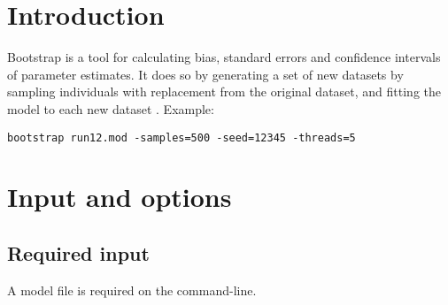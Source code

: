 



\maketitle
\newcommand{\guidetoolname}{bootstrap}


\section{Introduction}

Bootstrap is a tool for calculating bias, standard errors and confidence intervals of parameter estimates. It does so by generating a set of new datasets by sampling individuals with replacement from the original dataset, and fitting the model to each new dataset \cite{Efron}. 
Example:
\begin{verbatim}
bootstrap run12.mod -samples=500 -seed=12345 -threads=5
\end{verbatim}

\section{Input and options}

\subsection{Required input}
A model file is required on the command-line.

